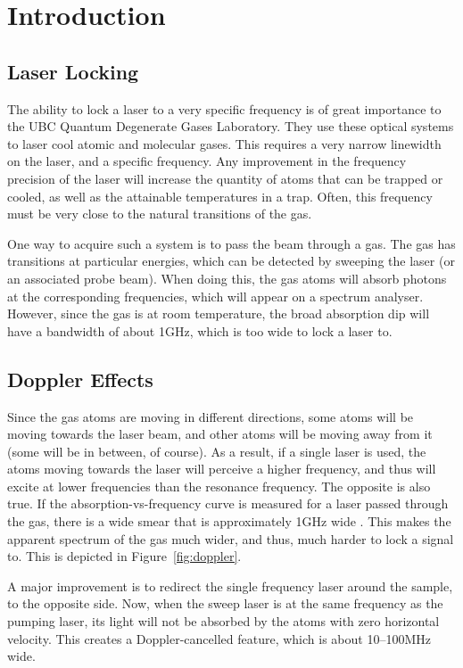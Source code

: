 \newpage
\section{Introduction}

\subsection{Laser Locking}

The ability to lock a laser to a very specific frequency is of great importance to the UBC Quantum Degenerate Gases Laboratory.  They use these optical systems to laser cool atomic and molecular gases.  This requires a very narrow linewidth on the laser, and a specific frequency.  Any improvement in the frequency precision of the laser will increase the quantity of atoms that can be trapped or cooled, as well as the attainable temperatures in a trap.  Often, this frequency must be very close to the natural transitions of the gas.

One way to acquire such a system is to pass the beam through a gas.  The gas has transitions at particular energies, which can be detected by sweeping the laser (or an associated probe beam).  When doing this, the gas atoms will absorb photons at the corresponding frequencies, which will appear on a spectrum analyser.  However, since the gas is at room temperature, the broad absorption dip will have a bandwidth of about 1GHz, which is too wide to lock a laser to.

\subsection{Doppler Effects}

Since the gas atoms are moving in different directions, some atoms will be moving towards the laser beam, and other atoms will be moving away from it (some will be in between, of course).  As a result, if a single laser is used, the atoms moving towards the laser will perceive a higher frequency, and thus will excite at lower frequencies than the resonance frequency.  The opposite is also true.  If the absorption-vs-frequency curve is measured for a laser passed through the gas, there is a wide smear that is approximately 1GHz wide \cite{madison14}.  This makes the apparent spectrum of the gas much wider, and thus, much harder to lock a signal to.  This is depicted in Figure~\ref{fig:doppler}.

A major improvement is to redirect the single frequency laser around the sample, to the opposite side.  Now, when the sweep laser is at the same frequency as the pumping laser, its light will not be absorbed by the atoms with zero horizontal velocity.  This creates a Doppler-cancelled feature, which is about 10--100MHz wide.

